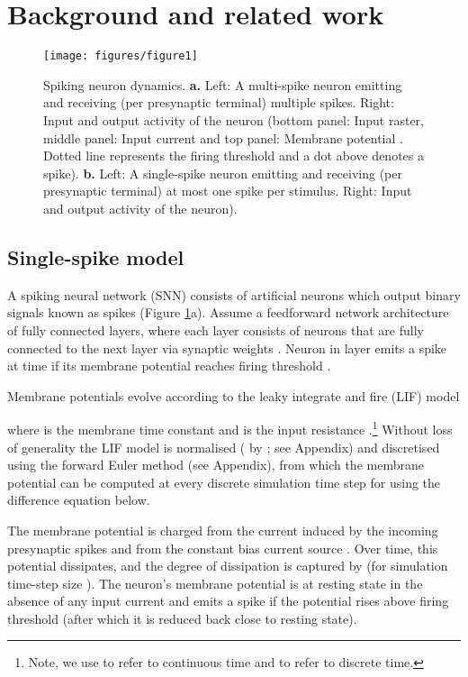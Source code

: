 \documentclass{article} \usepackage{iclr2023_conference,times}
\begin{document}
\section{Background and related work}
\begin{figure}[h!]
    \texttt{[image: figures/figure1]}
	\centering
	\caption{Spiking neuron dynamics. \textbf{a.} Left: A multi-spike neuron emitting and receiving (per presynaptic terminal) multiple spikes. Right: Input and output activity of the neuron (bottom panel: Input raster, middle panel: Input current  and top panel: Membrane potential . Dotted line represents the firing threshold and a dot above denotes a spike). \textbf{b.} Left: A single-spike neuron emitting and receiving (per presynaptic terminal) at most one spike per stimulus. Right: Input and output activity of the neuron).}
	\label{fig:intro}
\end{figure}
\subsection{Single-spike model}
\label{sec:21}
A spiking neural network (SNN) consists of artificial neurons which output binary signals known as spikes (Figure \ref{fig:intro}a). Assume a feedforward network architecture of  fully connected layers, where each layer  consists of  neurons that are fully connected to the next layer  via synaptic weights . Neuron  in layer  emits a spike  at time  if its membrane potential  reaches firing threshold .

Membrane potentials evolve according to the leaky integrate and fire (LIF) model

where  is the membrane time constant and  is the input resistance \citep{gerstner2014neuronal}.\footnote{Note, we use  to refer to continuous time and  to refer to discrete time.} Without loss of generality the LIF model is normalised ( by ; see Appendix) and discretised using the forward Euler method (see Appendix), from which the membrane potential can be computed at every discrete simulation time step  for  using the difference equation below.

The membrane potential is charged from the current induced by the incoming presynaptic spikes  and from the constant bias current source . Over time, this potential dissipates, and the degree of dissipation is captured by  (for simulation time-step size ). The neuron's membrane potential is at resting state  in the absence of any input current and emits a spike  if the potential rises above firing threshold  (after which it is reduced back close to resting state).
\end{document}
